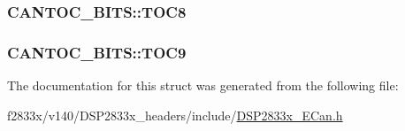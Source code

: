 \subsubsection[{T\+O\+C8}]{ C\+A\+N\+T\+O\+C\+\_\+\+B\+I\+T\+S\+::\+T\+O\+C8}\label{struct_c_a_n_t_o_c___b_i_t_s_ac3ff518c54a61ee13564fe624ca31f4c}
\hypertarget{struct_c_a_n_t_o_c___b_i_t_s_aa308a74689b727330437e79aeaddc4a3}{}
\subsubsection[{T\+O\+C9}]{ C\+A\+N\+T\+O\+C\+\_\+\+B\+I\+T\+S\+::\+T\+O\+C9}\label{struct_c_a_n_t_o_c___b_i_t_s_aa308a74689b727330437e79aeaddc4a3}


The documentation for this struct was generated from the following file\+:\begin{DoxyCompactItemize}
\item 
f2833x/v140/\+D\+S\+P2833x\+\_\+headers/include/\hyperlink{_d_s_p2833x___e_can_8h}{D\+S\+P2833x\+\_\+\+E\+Can.\+h}\end{DoxyCompactItemize}
